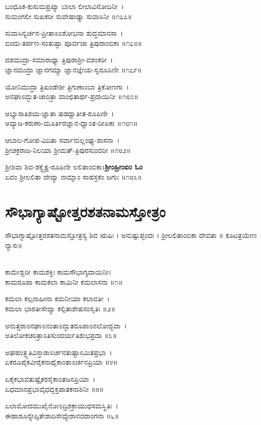 ಬಂಧೂಕ-ಕುಸುಮಪ್ರಖ್ಯಾ ಬಾಲಾ ಲೀಲಾವಿನೋದಿನೀ~।\\
ಸುಮಂಗಲೀ ಸುಖಕರೀ ಸುವೇಷಾಢ್ಯಾ ಸುವಾಸಿನೀ ॥೧೭೭॥

ಸುವಾಸಿನ್ಯರ್ಚನ-ಪ್ರೀತಾಽಽಶೋಭನಾ ಶುದ್ಧಮಾನಸಾ~।\\
ಬಿಂದು-ತರ್ಪಣ-ಸಂತುಷ್ಟಾ ಪೂರ್ವಜಾ ತ್ರಿಪುರಾಂಬಿಕಾ ॥೧೭೮॥

ದಶಮುದ್ರಾ-ಸಮಾರಾಧ್ಯಾ ತ್ರಿಪುರಾಶ್ರೀ-ವಶಂಕರೀ~।\\
ಜ್ಞಾನಮುದ್ರಾ ಜ್ಞಾನಗಮ್ಯಾ ಜ್ಞಾನಜ್ಞೇಯ-ಸ್ವರೂಪಿಣೀ ॥೧೭೯॥

ಯೋನಿಮುದ್ರಾ ತ್ರಿಖಂಡೇಶೀ ತ್ರಿಗುಣಾಂಬಾ ತ್ರಿಕೋಣಗಾ~।\\
ಅನಘಾಽದ್ಭುತ-ಚಾರಿತ್ರಾ ವಾಂಛಿತಾರ್ಥ-ಪ್ರದಾಯಿನೀ ॥೧೮೦॥

ಅಭ್ಯಾಸಾತಿಶಯ-ಜ್ಞಾತಾ ಷಡಧ್ವಾತೀತ-ರೂಪಿಣೀ~।\\
ಅವ್ಯಾಜ-ಕರುಣಾ-ಮೂರ್ತಿರಜ್ಞಾನ-ಧ್ವಾಂತ-ದೀಪಿಕಾ ॥೧೮೧॥

ಆಬಾಲ-ಗೋಪ-ವಿದಿತಾ ಸರ್ವಾನುಲ್ಲಂಘ್ಯ-ಶಾಸನಾ~।\\
ಶ್ರೀಚಕ್ರರಾಜ-ನಿಲಯಾ ಶ್ರೀಮತ್-ತ್ರಿಪುರಸುಂದರೀ ॥೧೮೨॥

ಶ್ರೀಶಿವಾ ಶಿವ-ಶಕ್ತ್ಯೈಕ್ಯ-ರೂಪಿಣೀ ಲಲಿತಾಂಬಿಕಾ।{\bfseries ಶ್ರೀಂಹ್ರೀಂಐಂ ಓಂ}\\
ಏವಂ ಶ್ರೀಲಲಿತಾ ದೇವ್ಯಾ ನಾಮ್ನಾಂ ಸಾಹಸ್ರಕಂ ಜಗುಃ ॥೧೮೩॥
\section{ಸೌಭಾಗ್ಯಾಷ್ಟೋತ್ತರಶತನಾಮಸ್ತೋತ್ರಂ }
ಸೌಭಾಗ್ಯಾಷ್ಟೋತ್ತರಶತನಾಮಸ್ತೋತ್ರಸ್ಯ ಶಿವ ಋಷಿಃ । ಅನುಷ್ಟುಪ್ಛಂದಃ । ಶ್ರೀಲಲಿತಾಂಬಿಕಾ  ದೇವತಾ ॥ ಕೂಟತ್ರಯೇಣ ನ್ಯಾಸಃ॥

\\
ಕಾಮೇಶ್ವರೀ ಕಾಮಶಕ್ತಿಃ ಕಾಮಸೌಭಾಗ್ಯದಾಯಿನೀ।\\
ಕಾಮರೂಪಾ ಕಾಮಕಲಾ ಕಾಮಿನೀ ಕಮಲಾಸನಾ ॥೧॥

ಕಮಲಾ ಕಲ್ಪನಾಹೀನಾ ಕಮನೀಯಾ ಕಲಾವತೀ~।\\
ಕಮಲಾ ಭಾರತೀಸೇವ್ಯಾ ಕಲ್ಪಿತಾಶೇಷಸಂಸೃತಿಃ ॥೨॥

ಅನುತ್ತರಾಽನಘಾಽನಂತಾಽದ್ಭುತರೂಪಾಽನಲೋದ್ಭವಾ~।\\
ಅತಿಲೋಕಚರಿತ್ರಾಽತಿಸುಂದರ್ಯತಿಶುಭಪ್ರದಾ ॥೩॥

ಅಘಹಂತ್ರ್ಯತಿವಿಸ್ತಾರಾಽರ್ಚನತುಷ್ಟಾಽಮಿತಪ್ರಭಾ~।\\
ಏಕರೂಪೈಕವೀರೈಕನಾಥೈಕಾಂತಾಽರ್ಚನಪ್ರಿಯಾ ॥೪॥

ಏಕೈಕಭಾವತುಷ್ಟೈಕರಸೈಕಾಂತಜನಪ್ರಿಯಾ~।\\
ಏಧಮಾನಪ್ರಭಾವೈಧದ್ಭಕ್ತಪಾತಕನಾಶಿನೀ ॥೫॥

ಏಲಾಮೋದಮುಖೈನೋಽದ್ರಿಶಕ್ರಾಯುಧಸಮಸ್ಥಿತಿಃ~।\\
ಈಹಾಶೂನ್ಯೇಪ್ಸಿತೇಶಾದಿಸೇವ್ಯೇಶಾನವರಾಂಗನಾ ॥೬॥


